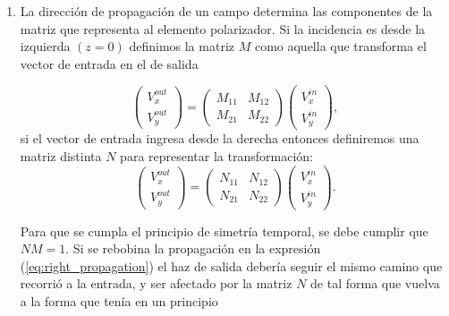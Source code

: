 \begin{enumerate}
\item La dirección de propagación de un campo determina las
  componentes de la matriz que representa al elemento polarizador. Si
  la incidencia es desde la izquierda $(z=0)$ definimos la matriz $M$ como aquella
  que transforma el vector de entrada en el de salida

  \begin{equation}
    \begin{pmatrix}
      V_x^{out}\\V_y^{out}
    \end{pmatrix}
    =
    \begin{pmatrix}
      M_{11}&M_{12}\\M_{21} & M_{22}
    \end{pmatrix}
    \begin{pmatrix}
      V_x^{in}\\V_y^{in}
    \end{pmatrix},
    \label{eq:right_propagation}
  \end{equation}
si el vector de entrada ingresa desde la derecha entonces
definiremos una matriz distinta $N$ para representar la transformación:
  \begin{equation*}
    \begin{pmatrix}
      V_x^{out}\\V_y^{out}
    \end{pmatrix}
    =
    \begin{pmatrix}
      N_{11}&N_{12}\\N_{21} & N_{22}
    \end{pmatrix}
    \begin{pmatrix}
      V_x^{in}\\V_y^{in}
    \end{pmatrix}.
  \end{equation*}

Para que se cumpla el principio de simetría temporal, se debe cumplir
que $NM=1$. Si se rebobina la propagación en la expresión
(\ref{eq:right_propagation}) el haz de salida 
debería seguir el mismo camino que recorrió a la entrada, y ser
afectado por la matriz $N$ de tal forma que vuelva a la forma que
tenía en un principio 


\end{enumerate}
